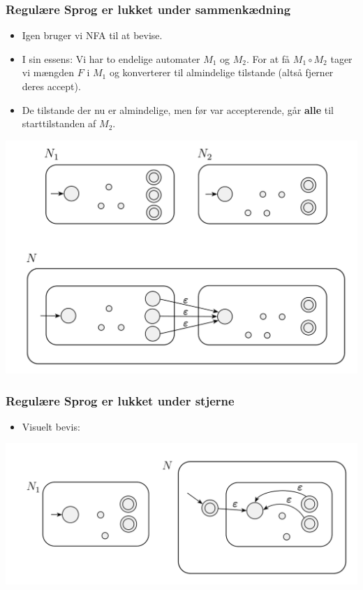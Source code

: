 \begin{frame}[allowframebreaks]
	\frametitle{Regulære Sprog er lukket under sammenkædning}

	\begin{itemize}
		\item Igen bruger vi NFA til at bevise.
		\item I sin essens: Vi har to endelige automater $M_{1}$ og $M_{2}$. For at få $M_{1} \circ M_{2}$ tager vi mængden $F$ i $M_{1}$ og konverterer til almindelige tilstande (altså fjerner deres accept).
		\item De tilstande der nu er almindelige, men før var accepterende, går \textbf{alle} til starttilstanden af $M_{2}$.
	\end{itemize}

	\includegraphics[width=\textwidth]{figur/figur148.png}
\end{frame}

\begin{frame}[allowframebreaks]
	\frametitle{Regulære Sprog er lukket under stjerne}

	\begin{itemize}
		\item Visuelt bevis:
	\end{itemize}
	\includegraphics[scale=0.4]{figur/figur150.png}
\end{frame}

